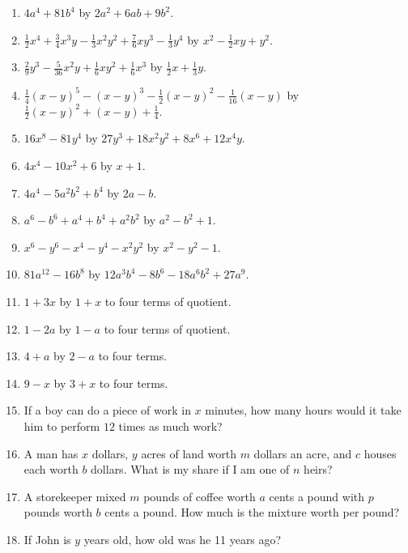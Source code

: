 \documentclass{book}
\begin{document}
\begin{enumerate}
\item $4a^4 + 81b^4$ by $2a^2 + 6ab + 9b^2$.

\item $\frac{1}{2}x^4 + \frac{3}{4}x^3y - \frac{1}{3}x^2y^2
    + \frac{7}{6}xy^3 - \frac{1}{3}y^4$
    by $x^2 - \frac{1}{2}xy + y^2$.

\item $\frac{2}{9}y^3 - \frac{5}{36}x^2y + \frac{1}{6}xy^2 +
\frac{1}{6}x^3$
   by $\frac{1}{2}x + \frac{1}{3}y$.

\item $\frac{1}{4}(x - y)^5 - (x - y)^3 - \frac{1}{2}(x - y)^2 -
\frac{1}{16}(x - y)$
    by $\frac{1}{2}(x - y)^2 + (x - y) +\frac{1}{4}$.

\item $16x^8 - 81y^4$ by $27y^3 + 18x^2y^2 + 8x^6 + 12x^4y$.

\item $4x^4 - 10x^2 + 6$ by $x + 1$.

\item $4a^4 - 5a^2b^2 + b^4$ by $2a - b$.

\item $a^6 - b^6 + a^4 + b^4 + a^2b^2$ by $a^2 - b^2 + 1$.

\item $x^6 - y^6 - x^4 - y^4 - x^2y^2$ by $x^2 - y^2 - 1$.

\item $81a^{12} - 16b^8$ by $12a^3b^4 - 8b^6 - 18a^6b^2 + 27a^9$.

\item $1 + 3x$ by $1 + x$ to four terms of quotient.

\item $1 - 2a$ by $1 - a$ to four terms of quotient.

\item $4 + a$ by $2 - a$ to four terms.

\item $9 - x$ by $3 + x$ to four terms.

\item If a boy can do a piece of work in $x$ minutes, how many
hours would it take him to perform $12$ times as much work?

\item A man has $x$ dollars, $y$ acres of land worth $m$ dollars
an acre, and $c$ houses each worth $b$ dollars. What is my share
if I am one of $n$ heirs?

\item A storekeeper mixed $m$ pounds of coffee worth $a$ cents a
pound with $p$ pounds worth $b$ cents a pound. How much is the
mixture worth per pound?

\item If John is $y$ years old, how old was he 11 years ago?
\end{enumerate}
\end{document}
